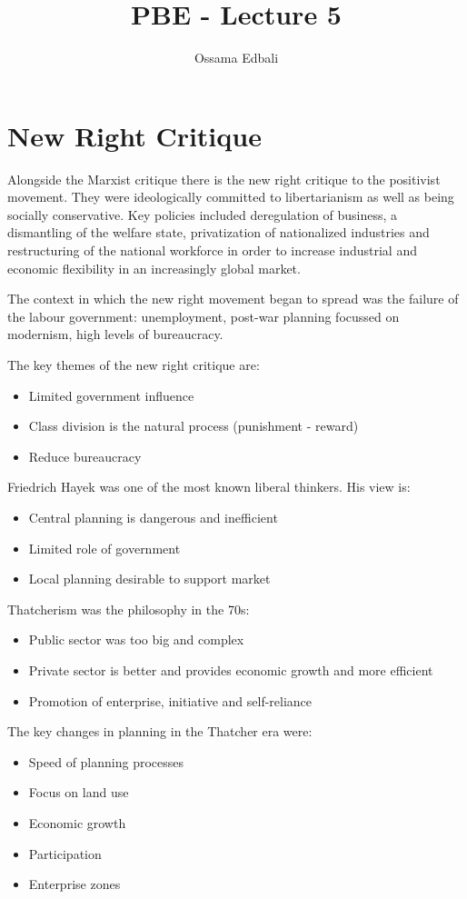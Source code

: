 \documentclass{article}
\title{PBE - Lecture 5}
\author{Ossama Edbali}
\begin{document}
	
	\maketitle
	
	\section*{New Right Critique}
	Alongside the Marxist critique there is the new right critique to the positivist movement.
	They were ideologically committed to libertarianism as well as being socially conservative.
	Key policies included deregulation of business, a dismantling of the welfare state,
	privatization of nationalized industries and restructuring of the national workforce
	in order to increase industrial and economic flexibility in an increasingly global market.
	
	The context in which the new right movement began to spread was the failure of the labour government:
	unemployment, post-war planning focussed on modernism, high levels of bureaucracy.
	
	The key themes of the new right critique are:
	\begin{itemize}
		\item Limited government influence
		\item Class division is the natural process (punishment - reward)
		\item Reduce bureaucracy
	\end{itemize}
	
	Friedrich Hayek was one of the most known liberal thinkers. His view is:
	\begin{itemize}
		\item Central planning is dangerous and inefficient
		\item Limited role of government
		\item Local planning desirable to support market
	\end{itemize}
	
	Thatcherism was the philosophy in the 70s:
	\begin{itemize}
		\item Public sector was too big and complex
		\item Private sector is better and provides economic growth and more efficient
		\item Promotion of enterprise, initiative and self-reliance
	\end{itemize}
	
	The key changes in planning in the Thatcher era were:
	\begin{itemize}
		\item Speed of planning processes
		\item Focus on land use
		\item Economic growth
		\item Participation
		\item Enterprise zones
	\end{itemize}
	
\end{document}
